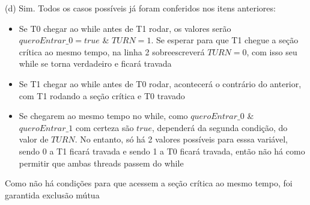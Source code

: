 \documentclass{homework}
\begin{document}
(d) Sim. Todos os casos possíveis já foram conferidos nos itens anteriores:
\begin{itemize}
    \item Se T0 chegar ao while antes de T1 rodar, os valores serão $queroEntrar\_0 = true$ \& $TURN = 1$. Se esperar para que T1 chegue a seção crítica ao mesmo tempo, na linha 2 sobreescreverá $TURN = 0$, com isso seu while se torna verdadeiro e ficará travada
    \item Se T1 chegar ao while antes de T0 rodar, acontecerá o contrário do anterior, com T1 rodando a seção crítica e T0 travado
    \item Se chegarem ao mesmo tempo no while, como $queroEntrar\_0$ \& $queroEntrar\_1$ com certeza são $true$, dependerá da segunda condição, do valor de $TURN$. No entanto, só há 2 valores possíveis para esssa variável, sendo 0 a T1 ficará travada e sendo 1 a T0 ficará travada, então não há como permitir que ambas threads passem do while
\end{itemize}
Como não há condições para que acessem a seção crítica ao mesmo tempo, foi garantida exclusão mútua
\end{document}
